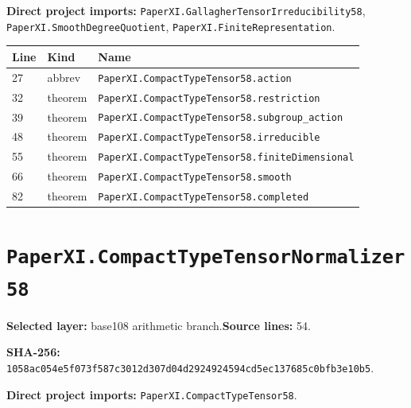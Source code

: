 \documentclass[10pt,oneside]{book}
\begin{document}

\textbf{Direct project imports:} \nolinkurl{PaperXI.GallagherTensorIrreducibility58}, \nolinkurl{PaperXI.SmoothDegreeQuotient}, \nolinkurl{PaperXI.FiniteRepresentation}.

\begin{longtable}{@{}p{}p{}p{}@{}}\toprule Line&Kind&Name\\\midrule\endhead

27&abbrev&\nolinkurl{PaperXI.CompactTypeTensor58.action}\\

32&theorem&\nolinkurl{PaperXI.CompactTypeTensor58.restriction}\\

39&theorem&\nolinkurl{PaperXI.CompactTypeTensor58.subgroup_action}\\

48&theorem&\nolinkurl{PaperXI.CompactTypeTensor58.irreducible}\\

55&theorem&\nolinkurl{PaperXI.CompactTypeTensor58.finiteDimensional}\\

66&theorem&\nolinkurl{PaperXI.CompactTypeTensor58.smooth}\\

82&theorem&\nolinkurl{PaperXI.CompactTypeTensor58.completed}\\

\bottomrule\end{longtable}

\section{\texorpdfstring{\nolinkurl{PaperXI.CompactTypeTensorNormalizer58}}{PaperXI.CompactTypeTensorNormalizer58}}\label{module:PaperXI.CompactTypeTensorNormalizer58}

\textbf{Selected layer:} base108 arithmetic branch.\quad\textbf{Source lines:} 54.\par\textbf{SHA-256:} {\scriptsize\nolinkurl{1058ac054e5f073f587c3012d307d04d2924924594cd5ec137685c0bfb3e10b5}}.


\textbf{Direct project imports:} \nolinkurl{PaperXI.CompactTypeTensor58}.
\end{document}
